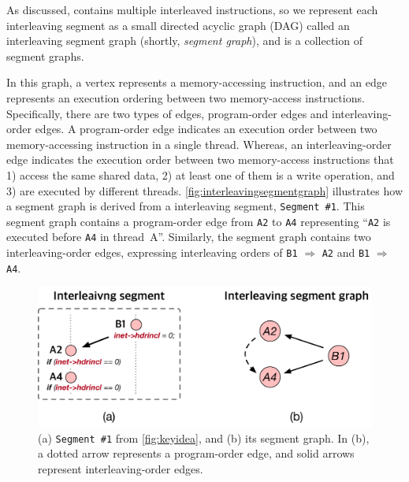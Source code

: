 As discussed, \intcov contains multiple interleaved instructions, 
so
we represent each interleaving segment as a small directed acyclic
graph (DAG) called an interleaving segment graph (shortly, \textit{segment graph}), and \intcov is a collection of segment graphs.

In this graph, a vertex represents a memory-accessing instruction, 
and an edge represents an execution ordering between two memory-access instructions. 
Specifically, there are two types of edges, program-order edges and
interleaving-order edges.
%
A program-order edge indicates an execution order between two 
memory-accessing instruction in a single thread.
Whereas, an interleaving-order edge indicates the execution
order between two memory-access instructions that 1) access the same
shared data, 2) at least one of them is a write operation, and 3) are
executed by different threads.
\autoref{fig:interleavingsegmentgraph} illustrates how a segment
graph is derived from a interleaving segment, \texttt{Segment \#1}.
This segment graph contains a program-order edge from \texttt{A2} to
\texttt{A4} representing ``\texttt{A2} is executed before \texttt{A4}
in thread~A''.
Similarly, the segment graph contains two interleaving-order
edges, expressing interleaving orders of \texttt{B1} $\Rightarrow$ \texttt{A2}
and \texttt{B1} $\Rightarrow$ \texttt{A4}.



\begin{figure}[t]
  \centering
  \includegraphics[width=0.8\linewidth]{fig/interleavingsegmentgraph.pdf}
  \caption{(a) \texttt{Segment \#1} from \autoref{fig:keyidea}, and
    (b) its segment graph. In (b), a dotted arrow represents a
    program-order edge, and solid arrows represent interleaving-order
    edges.}
  \label{fig:interleavingsegmentgraph}
\end{figure}

